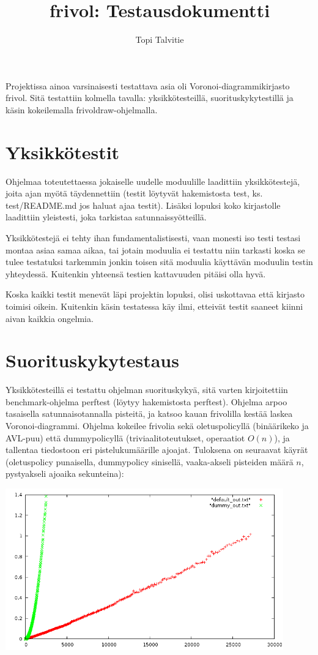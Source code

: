 \documentclass[a4paper, 11pt, finnish]{article}
\author{Topi Talvitie}
\title{frivol: Testausdokumentti}
\begin{document}
\maketitle

Projektissa ainoa varsinaisesti testattava asia oli Voronoi-diagrammikirjasto frivol. Sitä testattiin kolmella tavalla: yksikkötesteillä, suorituskykytestillä ja käsin kokeilemalla frivoldraw-ohjelmalla.

\section*{Yksikkötestit}
Ohjelmaa toteutettaessa jokaiselle uudelle moduulille laadittiin yksikkötestejä, joita ajan myötä täydennettiin (testit löytyvät hakemistosta test, ks. test/README.md jos haluat ajaa testit). Lisäksi lopuksi koko kirjastolle laadittiin yleistesti, joka tarkistaa satunnaissyötteillä.

Yksikkötestejä ei tehty ihan fundamentalistisesti, vaan monesti iso testi testasi montaa asiaa samaa aikaa, tai jotain moduulia ei testattu niin tarkasti koska se tulee testatuksi tarkemmin jonkin toisen sitä moduulia käyttävän moduulin testin yhteydessä. Kuitenkin yhteensä testien kattavuuden pitäisi olla hyvä.

Koska kaikki testit menevät läpi projektin lopuksi, olisi uskottavaa että kirjasto toimisi oikein. Kuitenkin käsin testatessa käy ilmi, etteivät testit saaneet kiinni aivan kaikkia ongelmia.

\section*{Suorituskykytestaus}
Yksikkötesteillä ei testattu ohjelman suorituskykyä, sitä varten kirjoitettiin benchmark-ohjelma perftest (löytyy hakemistosta perftest). Ohjelma arpoo tasaisella satunnaisotannalla pisteitä, ja katsoo kauan frivolilla kestää laskea Voronoi-diagrammi. Ohjelma kokeilee frivolia sekä oletuspolicyllä (binäärikeko ja AVL-puu) että dummypolicyllä (triviaalitoteutukset, operaatiot $O(n)$), ja tallentaa tiedostoon eri pistelukumäärille ajoajat. Tuloksena on seuraavat käyrät (oletuspolicy punaisella, dummypolicy sinisellä, vaaka-akseli pisteiden määrä $n$, pystyakseli ajoaika sekunteina):

\includegraphics[width=12cm]{perftest.png}
\end{document}
